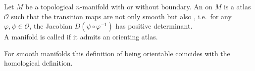 \documentclass[a4paper,12pt]{article}
\begin{document}
\begin{definition}
    Let \(M\) be a topological \(n\)-manifold with or without boundary. An  on \(M\) is a atlas \(\mathcal{O}\) such that the transition maps are not only smooth but also , i.e.\ for any \(\varphi,\psi\in\mathcal{O}\), the Jacobian \(D(\psi\circ\varphi^{-1})\) has positive determinant.\\
    A manifold is called  if it admits an orienting atlas.
\end{definition}

\begin{remark}
    For smooth manifolds this definition of being orientable coincides with the homological definition.
\end{remark}







\end{document}
